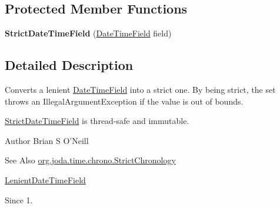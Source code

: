 \subsection*{Protected Member Functions}
\begin{DoxyCompactItemize}
\item 
\hypertarget{classorg_1_1joda_1_1time_1_1field_1_1_strict_date_time_field_a9d504aa9b668ee5ea2af318afab0fc09}{{\bfseries Strict\-Date\-Time\-Field} (\hyperlink{classorg_1_1joda_1_1time_1_1_date_time_field}{Date\-Time\-Field} field)}\label{classorg_1_1joda_1_1time_1_1field_1_1_strict_date_time_field_a9d504aa9b668ee5ea2af318afab0fc09}

\end{DoxyCompactItemize}


\subsection{Detailed Description}
Converts a lenient \hyperlink{classorg_1_1joda_1_1time_1_1_date_time_field}{Date\-Time\-Field} into a strict one. By being strict, the set throws an Illegal\-Argument\-Exception if the value is out of bounds. 

\hyperlink{classorg_1_1joda_1_1time_1_1field_1_1_strict_date_time_field}{Strict\-Date\-Time\-Field} is thread-\/safe and immutable.

\begin{DoxyAuthor}{Author}
Brian S O'Neill 
\end{DoxyAuthor}
\begin{DoxySeeAlso}{See Also}
\hyperlink{classorg_1_1joda_1_1time_1_1chrono_1_1_strict_chronology}{org.\-joda.\-time.\-chrono.\-Strict\-Chronology} 

\hyperlink{classorg_1_1joda_1_1time_1_1field_1_1_lenient_date_time_field}{Lenient\-Date\-Time\-Field} 
\end{DoxySeeAlso}
\begin{DoxySince}{Since}
1. 
\end{DoxySince}


